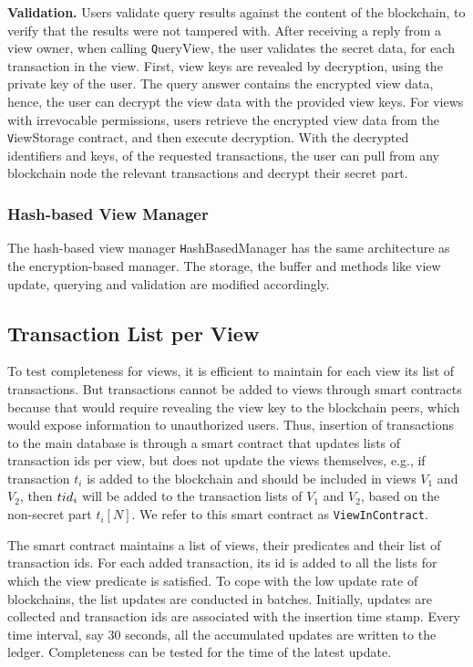 \medskip
\noindent
\textbf{Validation.}
Users validate query results against the content of the blockchain, to verify that the results were not tampered with. After receiving a reply from a view owner, when calling {\texttt QueryView}, the user validates the secret data, for each transaction in the view. 
First, view keys are revealed by decryption, using the private key of the user. 
The query answer contains the encrypted view data, hence,
the user can decrypt the view data with the provided view keys.
For views with irrevocable permissions, users retrieve the encrypted view data from the {\texttt ViewStorage} contract, and then execute decryption. 
With the decrypted identifiers and keys, of the requested transactions, the user can pull from any blockchain node the relevant transactions and decrypt their secret part. 


\subsubsection{Hash-based View Manager}

The hash-based view manager  {\texttt HashBasedManager} has the same architecture as the encryption-based manager.
The storage, the buffer and methods like view update, querying and validation are modified accordingly.



\subsection{Transaction List per View}
\label{ch:view:impl:view_merge}
To test completeness for views, it is efficient to maintain for each view its list of transactions. But transactions cannot be added to views through smart contracts because that would require revealing the view key to the blockchain peers, which would expose information to unauthorized users. Thus, insertion of transactions to the main database is through a smart contract that updates lists of transaction ids per view, but does not update the views themselves, e.g., if transaction $t_i$ is added to the blockchain and should be included in views $V_1$ and $V_2$, then ${tid\/}_{i}$ will be added to the transaction lists of $V_1$ and $V_2$, based on the non-secret part $t_i[N]$.
We refer to this smart contract as 
\texttt{ViewInContract}.

The smart contract maintains a list of views, their predicates and their list of transaction ids. For each added transaction, its id is added to all the lists for which the view predicate is satisfied. To cope with the low update rate of blockchains, the list updates are conducted in batches. Initially, updates are collected and transaction ids are associated with the insertion time stamp. Every time interval, say 30 seconds, all the accumulated updates are written to the ledger. Completeness can be tested for the time of the latest update.


